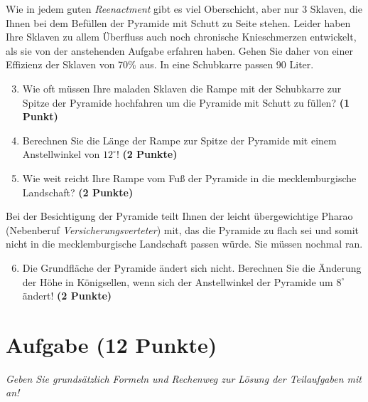 \documentclass[a4paper, 9pt]{scrartcl}\usepackage[]{graphicx}\usepackage[]{xcolor}
\begin{document}
Wie in jedem guten \textit{Reenactment} gibt es viel Oberschicht, aber nur
3 Sklaven, die Ihnen bei dem Bef{\"u}llen der Pyramide mit Schutt
zu Seite stehen. Leider haben Ihre Sklaven zu allem {\"U}berfluss auch noch
chronische Knieschmerzen entwickelt, als sie von der
anstehenden Aufgabe erfahren haben. Gehen Sie daher von einer Effizienz der
Sklaven von 70\% aus. In eine Schubkarre passen
90 Liter.

\begin{enumerate}
  \setcounter{enumi}{2}
\item Wie oft m{\"u}ssen Ihre maladen Sklaven die Rampe mit der Schubkarre
  zur Spitze der Pyramide hochfahren um die Pyramide mit Schutt zu f{\"u}llen? \textbf{(1 Punkt)}
\item Berechnen Sie die L{\"a}nge der Rampe zur Spitze der Pyramide mit einem
  Anstellwinkel von $12^\circ$! \textbf{(2 Punkte)}
\item Wie weit reicht Ihre Rampe vom Fu{\ss} der Pyramide in die mecklemburgische
  Landschaft?  \textbf{(2 Punkte)}
\end{enumerate}

Bei der Besichtigung der Pyramide teilt Ihnen der leicht {\"u}bergewichtige
Pharao (Nebenberuf \textit{Versicherungsverteter}) mit, das die Pyramide zu
flach sei und somit nicht in die mecklemburgische Landschaft passen
w{\"u}rde. Sie m{\"u}ssen nochmal ran.

\begin{enumerate}
  \setcounter{enumi}{5}
\item Die Grundfl{\"a}che der Pyramide {\"a}ndert sich nicht. Berechnen Sie die
  {\"A}nderung der H{\"o}he in K{\"o}nigsellen, wenn sich der Anstellwinkel der
  Pyramide um $8^\circ$ {\"a}ndert!  \textbf{(2 Punkte)}
\end{enumerate}



\clearpage

\section{Aufgabe \hfill (12 Punkte)}

\textit{Geben Sie grunds{\"a}tzlich Formeln und Rechenweg zur L{\"o}sung der
  Teilaufgaben mit an!} \\[1Ex]
\end{document}
